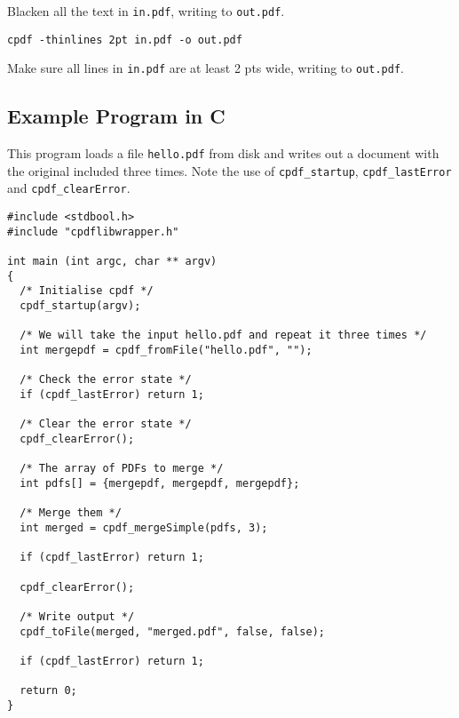 \documentclass{book}
\begin{document}
\noindent Blacken all the text in \texttt{in.pdf}, writing to \texttt{out.pdf}.

\begin{framed}\noindent\texttt{cpdf -thinlines 2pt in.pdf -o out.pdf}\end{framed}

\noindent Make sure all lines in \texttt{in.pdf} are at least 2 pts wide, writing to \texttt{out.pdf}.
\pagestyle{empty}
\cleardoublepage

\begin{cpdflib}
\chapter*{Example Program in C}

This program loads a file \texttt{hello.pdf} from disk and writes out a document with the original included three times. Note the use of \texttt{cpdf\_startup}, \texttt{cpdf\_lastError} and \texttt{cpdf\_clearError}.

\begin{small}
\begin{verbatim}
#include <stdbool.h>
#include "cpdflibwrapper.h"

int main (int argc, char ** argv)
{
  /* Initialise cpdf */
  cpdf_startup(argv);

  /* We will take the input hello.pdf and repeat it three times */
  int mergepdf = cpdf_fromFile("hello.pdf", "");

  /* Check the error state */
  if (cpdf_lastError) return 1;

  /* Clear the error state */
  cpdf_clearError();

  /* The array of PDFs to merge */
  int pdfs[] = {mergepdf, mergepdf, mergepdf};

  /* Merge them */
  int merged = cpdf_mergeSimple(pdfs, 3);
  
  if (cpdf_lastError) return 1;

  cpdf_clearError();

  /* Write output */
  cpdf_toFile(merged, "merged.pdf", false, false);

  if (cpdf_lastError) return 1;

  return 0;
}
\end{verbatim}
\end{small}
\end{cpdflib}
\end{document}
